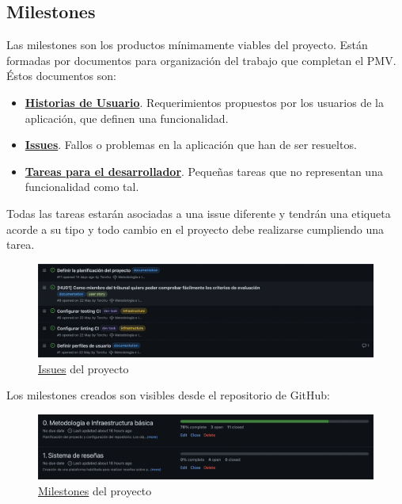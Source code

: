 \subsection{Milestones}
Las milestones son los productos mínimamente viables del proyecto. Están formadas por documentos para organización del
trabajo que completan el PMV.\\

Éstos documentos son:
\begin{itemize}
    \item \href{https://github.com/Torchu/flixbuff/labels/user story}{\textbf{Historias de Usuario}}. Requerimientos
    propuestos por los usuarios de la aplicación, que definen una funcionalidad.
    \item \href{https://github.com/Torchu/flixbuff/labels/issue}{\textbf{Issues}}. Fallos o problemas en la aplicación
    que han de ser resueltos.
    \item \href{https://github.com/Torchu/flixbuff/labels/dev task}{\textbf{Tareas para el desarrollador}}. Pequeñas
    tareas que no representan una funcionalidad como tal.
\end{itemize}

Todas las tareas estarán asociadas a una issue diferente y tendrán una etiqueta acorde a su tipo y todo cambio en el
proyecto debe realizarse cumpliendo una tarea.
\begin{figure}[H]
	\centering	
	\includegraphics[scale=0.3]{img/issues.png}
	\caption{\href{https://github.com/Torchu/flixbuff/issues}{Issues} del proyecto}\label{fig:github_issues}
\end{figure}

Los milestones creados son visibles desde el repositorio de GitHub:
\begin{figure}[H]
	\centering	
	\includegraphics[scale=0.3]{img/milestones.png}
	\caption{\href{https://github.com/Torchu/flixbuff/milestones}{Milestones} del proyecto}\label{fig:github_milestones}
\end{figure}

